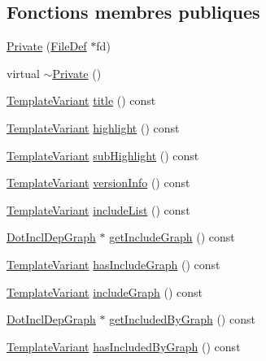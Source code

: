 \subsection*{Fonctions membres publiques}
\begin{DoxyCompactItemize}
\item 
\hyperlink{class_file_context_1_1_private_aa524d442ceb7b106d226bbd258800b98}{Private} (\hyperlink{class_file_def}{File\+Def} $\ast$fd)
\item 
virtual \hyperlink{class_file_context_1_1_private_af3ee98a945134811587ccbbf10f9ac9e}{$\sim$\+Private} ()
\item 
\hyperlink{class_template_variant}{Template\+Variant} \hyperlink{class_file_context_1_1_private_a5268330e9c6cc427d8b2d1ac854bb3c5}{title} () const 
\item 
\hyperlink{class_template_variant}{Template\+Variant} \hyperlink{class_file_context_1_1_private_a6242e2065ff2d684515bd89dc9497cbf}{highlight} () const 
\item 
\hyperlink{class_template_variant}{Template\+Variant} \hyperlink{class_file_context_1_1_private_aea2c54207fd57076fcb17637f0dc697f}{sub\+Highlight} () const 
\item 
\hyperlink{class_template_variant}{Template\+Variant} \hyperlink{class_file_context_1_1_private_aaf85efe34f336e2eb53943c4e958ba18}{version\+Info} () const 
\item 
\hyperlink{class_template_variant}{Template\+Variant} \hyperlink{class_file_context_1_1_private_a2f5c2bfed777bb4ef962f1e8add145f2}{include\+List} () const 
\item 
\hyperlink{class_dot_incl_dep_graph}{Dot\+Incl\+Dep\+Graph} $\ast$ \hyperlink{class_file_context_1_1_private_adc9fb2972714e39f1e49fd9542996311}{get\+Include\+Graph} () const 
\item 
\hyperlink{class_template_variant}{Template\+Variant} \hyperlink{class_file_context_1_1_private_a8e1e5c6cb4257cb5bd431d23089cb29f}{has\+Include\+Graph} () const 
\item 
\hyperlink{class_template_variant}{Template\+Variant} \hyperlink{class_file_context_1_1_private_a3199098c9a87066ef587f5bab55a4773}{include\+Graph} () const 
\item 
\hyperlink{class_dot_incl_dep_graph}{Dot\+Incl\+Dep\+Graph} $\ast$ \hyperlink{class_file_context_1_1_private_aee06559f3af8287dc954e35d8a4f1800}{get\+Included\+By\+Graph} () const 
\item 
\hyperlink{class_template_variant}{Template\+Variant} \hyperlink{class_file_context_1_1_private_a558945023328cf0229d9d8d3994863ab}{has\+Included\+By\+Graph} () const 

\end{DoxyCompactItemize}
